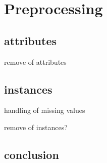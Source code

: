 \section{Preprocessing}


\subsection{attributes}

remove of attributes


\subsection{instances}

handling of missing values

remove of instances?


\subsection{conclusion}